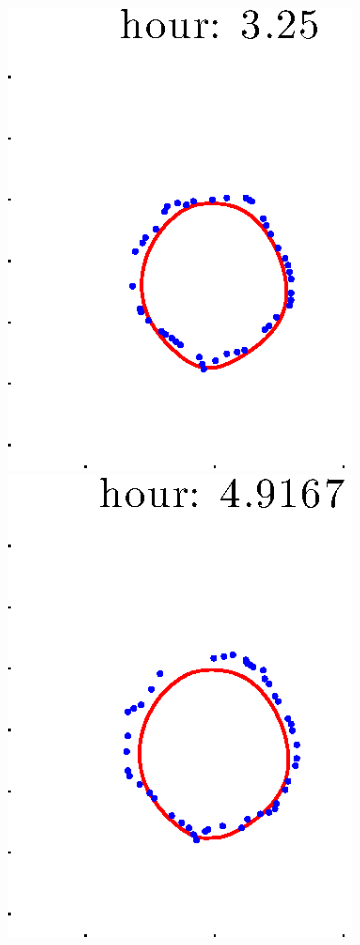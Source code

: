 \documentclass[12pt]{article}
\begin{document}
\begin{figure}[h!]
\begin{subfigure}[b]{.3\textwidth}
		\includegraphics[height=.15\textheight]{Pos14exp8/full/first3.eps}
		\includegraphics[height=.15\textheight]{Pos14exp8/full/first4.eps}

\end{subfigure}
\end{figure}
\end{document}
